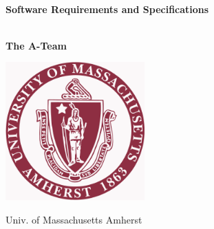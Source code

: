 \begin{titlepage}
    \begin{center}
        \vspace*{1cm}
        
 
        \HRule \\[0.4cm]
        {   \huge\textbf{Software Requirements and Specifications}\\[0.4cm] }
        \HRule \\[1cm]
       
        
        \vspace{0.5cm}
        \LARGE
   
        
        \vspace{1.5cm}
        
        \textbf{The A-Team}
        
        \vfill
        

        
        \vspace{0.8cm}
        
        \includegraphics[width=0.4\textwidth]{UMASS_logo}
        
        \Large
Univ. of Massachusetts Amherst
        
    \end{center}
\end{titlepage}
